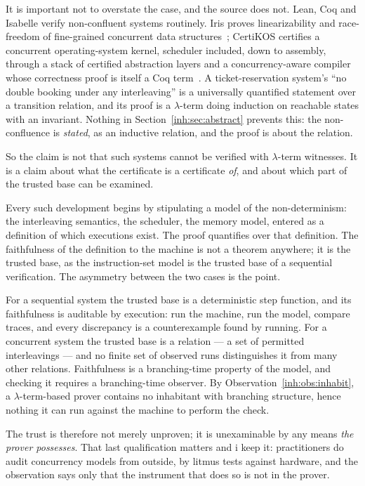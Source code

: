 It is important not to overstate the case, and the source does not.
Lean, Coq and Isabelle verify non-confluent systems routinely.
Iris proves linearizability and race-freedom of fine-grained concurrent
data structures~\cite{Iris}; CertiKOS certifies a concurrent
operating-system kernel, scheduler included, down to assembly, through
a stack of certified abstraction layers and a concurrency-aware compiler
whose correctness proof is itself a Coq term~\cite{CertiKOS}.
A ticket-reservation system's ``no double booking under any
interleaving'' is a universally quantified statement over a transition
relation, and its proof is a $\lambda$-term doing induction on reachable
states with an invariant.
Nothing in Section~\ref{inh:sec:abstract} prevents this: the
non-confluence is \emph{stated}, as an inductive relation, and the
proof is about the relation.

So the claim is not that such systems cannot be verified with
$\lambda$-term witnesses.
It is a claim about what the certificate is a certificate \emph{of},
and about which part of the trusted base can be examined.

Every such development begins by stipulating a model of the
non-determinism: the interleaving semantics, the scheduler, the memory
model, entered as a definition of which executions exist.
The proof quantifies over that definition.
The faithfulness of the definition to the machine is not a theorem
anywhere; it is the trusted base, as the instruction-set model is the
trusted base of a sequential verification.
The asymmetry between the two cases is the point.

\begin{observation}[Unauditability]
\label{inh:obs:audit}
For a sequential system the trusted base is a deterministic step
function, and its faithfulness is auditable by execution: run the
machine, run the model, compare traces, and every discrepancy is a
counterexample found by running.
For a concurrent system the trusted base is a relation --- a set of
permitted interleavings --- and no finite set of observed runs
distinguishes it from many other relations.
Faithfulness is a branching-time property of the model, and checking it
requires a branching-time observer.
By Observation~\ref{inh:obs:inhabit}, a $\lambda$-term-based prover
contains no inhabitant with branching structure, hence nothing it can
run against the machine to perform the check.
\end{observation}

The trust is therefore not merely unproven; it is unexaminable by any
means \emph{the prover possesses}.
That last qualification matters and i keep it: practitioners do audit
concurrency models from outside, by litmus tests against hardware,
and the observation says only that the instrument that does so is not
in the prover.

